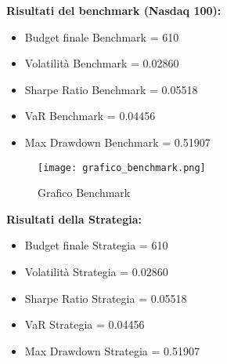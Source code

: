 \documentclass{article}
\begin{document}
\textbf{Risultati del benchmark (Nasdaq 100):}
\begin{itemize}
    \item Budget finale Benchmark = 610
    \item Volatilità Benchmark = 0.02860
    \item Sharpe Ratio Benchmark = 0.05518
    \item VaR Benchmark = 0.04456
    \item Max Drawdown Benchmark = 0.51907
\end{itemize}

\vspace{2em}

\begin{figure}[h]
    \centering
    \texttt{[image: grafico\_benchmark.png]}  %
    \caption{Grafico Benchmark}  %
    \label{fig:grafico_benchmark}
\end{figure}

\vspace{2em}  %

\textbf{Risultati della Strategia:}
\begin{itemize}
    \item Budget finale Strategia = 610
    \item Volatilità Strategia = 0.02860
    \item Sharpe Ratio Strategia = 0.05518
    \item VaR Strategia = 0.04456
    \item Max Drawdown Strategia = 0.51907
\end{itemize}
\end{document}
